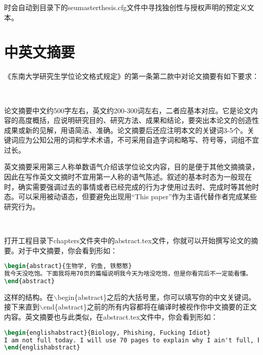 \noindent 时会自动到目录下的seumasterthesis.cfg文件中寻找独创性与授权声明的预定义文本。

\section{中英文摘要}

《东南大学研究生学位论文格式规定》\cite{seugs2015rule}的第一条第二款中对论文摘要有如下要求：

~

{\color{black!45}
\noindent 论文摘要中文约500字左右，英文约200-300词左右，二者应基本对应。它是论文内容的高度概括，应说明研究目的、研究方法、成果和结论，要突出本论文的创造性成果或新的见解，用语简洁、准确。论文摘要后还应注明本文的关键词3-5个。关键词应为公知公用的词和学术术语，不可采用自造字词和略写、符号等，词组不宜过长。

\noindent 英文摘要采用第三人称单数语气介绍该学位论文内容，目的是便于其他文摘摘录，因此在写作英文文摘时不宜用第一人称的语气陈述。叙述的基本时态为一般现在时，确实需要强调过去的事情或者已经完成的行为才使用过去时、完成时等其他时态。可以采用被动语态，但要避免出现用“This paper”作为主语代替作者完成某些研究行为。}

~

打开工程目录下chapters文件夹中的abstract.tex文件，你就可以开始撰写论文的摘要。对于中文摘要，你会看到形如：

\begin{tcolorbox}
\begin{lstlisting}[language=TeX]
\begin{abstract}{生物学, 钓鱼, 铁憨憨}
我今天没吃饱。下面我将用70页的篇幅说明我今天为啥没吃饱，但是你看完后不一定能看懂。
\end{abstract}
\end{lstlisting}
\end{tcolorbox}

\noindent 这样的结构。在{\codefont $\backslash$begin\{abstract\}}之后的大括号里，你可以填写你的中文关键词。接下来直到{\codefont $\backslash$end\{abstract\}}之前的所有内容都将在编译时被视作你中文摘要的正文内容。英文摘要也与此类似，在abstract.tex文件中，你会看到形如：

\begin{tcolorbox}
\begin{lstlisting}[language=TeX]
\begin{englishabstract}{Biology, Phishing, Fucking Idiot}
I am not full today. I will use 70 pages to explain why I ain't full, but you may not understand after reading this piece of shit.
\end{englishabstract}
\end{lstlisting}
\end{tcolorbox}

